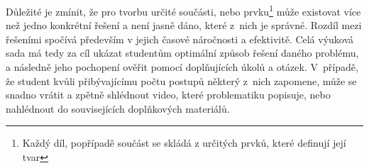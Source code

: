 Důležité je zmínit, že pro tvorbu určité součásti, nebo prvku\footnote{Každý díl, popřípadě součást se skládá z určitých prvků, které definují její tvar} může existovat více než jedno konkrétní řešení a není jasně dáno, které z~nich je správné.
Rozdíl mezi řešeními spočívá především v jejich časové náročnosti a efektivitě.
Celá výuková sada má tedy za cíl ukázat studentům optimální způsob řešení daného problému, a následně jeho pochopení ověřit pomocí doplňujících úkolů a otázek.
V~případě, že student kvůli přibývajícímu počtu postupů některý z~nich zapomene, může se snadno vrátit a zpětně shlédnout video, které problematiku popisuje, nebo nahlédnout do souvisejících doplňkových materiálů.

\newpage
